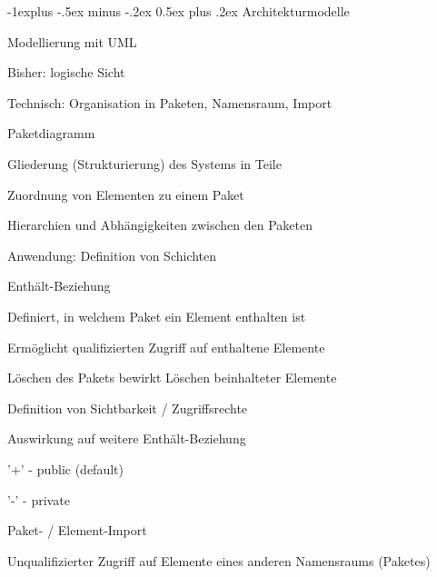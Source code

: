 \documentclass[a4paper]{article}
\makeatletter
\renewcommand{\subsection}{\@startsection{subsection}{2}{0mm}%
                                {-1explus -.5ex minus -.2ex}%
                                {0.5ex plus .2ex}%
                                {\normalfont\normalsize\bfseries}}
\makeatother
\begin{document}
\begin{multicols}{3}
  \subsection{Architekturmodelle}
  \begin{itemize*}
    \item Modellierung mit UML
          \begin{itemize*}
            \item Bisher: logische Sicht
            \item Technisch: Organisation in Paketen, Namensraum, Import
          \end{itemize*}
    \item Paketdiagramm
          \begin{itemize*}
            \item Gliederung (Strukturierung) des Systems in Teile
            \item Zuordnung von Elementen zu einem Paket
            \item Hierarchien und Abhängigkeiten zwischen den Paketen
            \item Anwendung: Definition von Schichten
          \end{itemize*}
    \item Enthält-Beziehung
          \begin{itemize*}
            \item Definiert, in welchem Paket ein Element enthalten ist
            \item Ermöglicht qualifizierten Zugriff auf enthaltene Elemente
            \item Löschen des Pakets bewirkt Löschen beinhalteter Elemente
            \item Definition von Sichtbarkeit / Zugriffsrechte
                  \begin{itemize*}
                    \item Auswirkung auf weitere Enthält-Beziehung
                    \item '+' - public (default)
                    \item '-' - private
                  \end{itemize*}
          \end{itemize*}
    \item Paket- / Element-Import
          \begin{itemize*}
            \item Unqualifizierter Zugriff auf Elemente eines anderen Namensraums (Paketes)
          \end{itemize*}

\end{itemize*}
\end{multicols}
\end{document}
